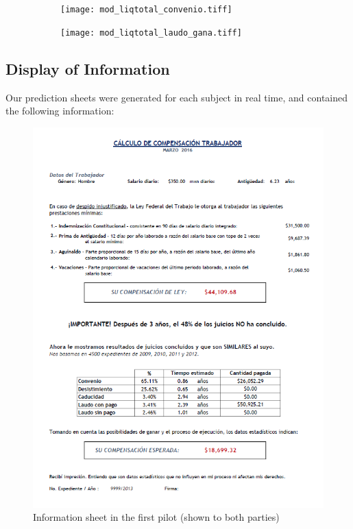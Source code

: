 \documentclass[]{article}
\begin{document}
\begin{figure}[H]
    \caption{Compensation predictions in the first pilot}
    \label{}
    \begin{center}
    \begin{subfigure}{0.49\textwidth}
    \centering
        \texttt{[image: mod\_liqtotal\_convenio.tiff]}
     \end{subfigure}
     \begin{subfigure}{0.49\textwidth}
    \centering
        \texttt{[image: mod\_liqtotal\_laudo\_gana.tiff]}
     \end{subfigure}
  \end{center}
\end{figure}


\subsection{Display of Information}\label{display-of-information}

Our prediction sheets were generated for each subject in real time, and
contained the following information:

\begin{figure}[H]
\centering
\caption{Information sheet in the first pilot (shown to both parties)}
\includegraphics{calctreat.png}
\end{figure}
\end{document}
